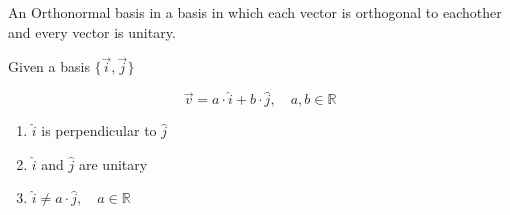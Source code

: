 \documentclass[a4paper]{article}
\begin{document}
An Orthonormal basis in a basis in which each vector is orthogonal to eachother and every vector
is unitary.


Given a basis \(\{\vec{i}, \vec{j}\}\)

\[
    \vec{v} = a \cdot \hat{i} + b \cdot \hat{j},
    \quad a,b \in \mathbb{R}
\]

\begin{enumerate} %
    \item \(\hat{i}\) is perpendicular to \(\hat{j}\)
    \item \(\hat{i}\) and \(\hat{j}\) are unitary
    \item \(\hat{i} \neq a\cdot\hat{j},\quad a\in \mathbb{R}\)  
\end{enumerate}

\pagebreak
\end{document}
